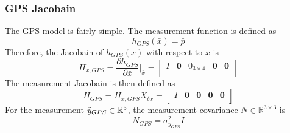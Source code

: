 \subsubsection{GPS Jacobain}
The GPS model is fairly simple. The measurement function is defined as
\begin{equation}
    h_{GPS}(\bar{x}) = \bar{p}
    \label{eq: gps measurement fuction quaternion}
\end{equation}
Therefore, the Jacobain of $h_{GPS}(\bar{x})$ with respect to $\bar{x}$ is
\begin{equation}
    H_{x,GPS} = \frac{\partial h_{GPS}}{\partial \bar{x}} \bigg|_{\bar{x}} = \begin{bmatrix}
        I & \mathbf{0} & 0_{3 \times 4} & \mathbf{0} & \mathbf{0} \\
        \end{bmatrix}
    \label{eq: H quaternion full}
\end{equation}
The measurement Jacobain is then defined as
\begin{equation}
    H_{GPS} = H_{x,GPS} X_{\delta x} = \begin{bmatrix}
        I & \mathbf{0} & \mathbf{0} & \mathbf{0} & \mathbf{0} \\
        \end{bmatrix}
    \label{eq: measurement jacobain H}
\end{equation}
For the measurement $\Tilde{y}_{GPS} \in \mathbb{R}^{3}$, the measurement covariance $N \in \mathbb{R}^{3 \times 3}$ is
\begin{equation}
   N_{GPS} = \sigma^2_{y_{GPS}} I
    \label{eq: N gps quaternion}
\end{equation}

